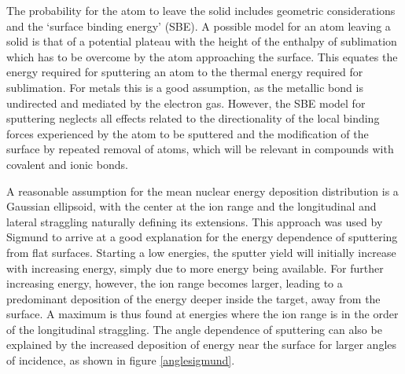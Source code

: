 The probability for the atom to leave the solid includes geometric considerations and the `surface binding energy' (SBE). A possible model for an atom leaving a solid is that of a potential plateau with the height of the enthalpy of sublimation which has to be overcome by the atom approaching the surface. This equates the energy required for sputtering an atom to the thermal energy required for sublimation. For metals this is a good assumption, as the metallic bond is undirected and mediated by the electron gas. However, the SBE model for sputtering neglects all effects related to the directionality of the local binding forces experienced by the atom to be sputtered and the modification of the surface by repeated removal of atoms, which will be relevant in compounds with covalent and ionic bonds.  

A reasonable assumption for the mean nuclear energy deposition distribution is a Gaussian ellipsoid, with the center at the ion range and the longitudinal and lateral straggling naturally defining its extensions. This approach was used by Sigmund to arrive at a good explanation for the energy dependence of sputtering from flat surfaces. Starting a low energies, the sputter yield will initially increase with increasing energy, simply due to more energy being available. For further increasing energy, however, the ion range becomes larger, leading to a predominant deposition of the energy deeper inside the target, away from the surface. A maximum is thus found at energies where the ion range is in the order of the longitudinal straggling. The angle dependence of sputtering can also be explained by the increased deposition of energy near the surface for larger angles of incidence, as shown in figure \ref{anglesigmund}.

